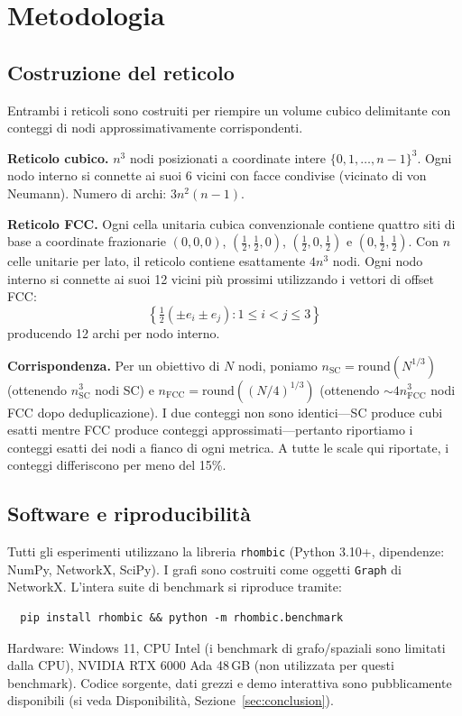 \documentclass[11pt]{article}
\begin{document}
\section{Metodologia}
\label{sec:method}

\subsection{Costruzione del reticolo}

Entrambi i reticoli sono costruiti per riempire un volume cubico
delimitante con conteggi di nodi approssimativamente corrispondenti.

\textbf{Reticolo cubico.} $n^3$ nodi posizionati a coordinate intere
$\{0, 1, \ldots, n{-}1\}^3$. Ogni nodo interno si connette ai suoi
6 vicini con facce condivise (vicinato di von Neumann). Numero di archi:
$3n^2(n-1)$.

\textbf{Reticolo FCC.} Ogni cella unitaria cubica convenzionale contiene
quattro siti di base a coordinate frazionarie $(0,0,0)$,
$(\tfrac{1}{2},\tfrac{1}{2},0)$, $(\tfrac{1}{2},0,\tfrac{1}{2})$ e
$(0,\tfrac{1}{2},\tfrac{1}{2})$. Con $n$ celle unitarie per lato, il
reticolo contiene esattamente $4n^3$ nodi. Ogni nodo interno si connette
ai suoi 12 vicini pi\`u prossimi utilizzando i vettori di offset FCC:
\begin{equation}
  \left\{\tfrac{1}{2}(\pm e_i \pm e_j) : 1 \leq i < j \leq 3\right\}
\end{equation}
producendo 12 archi per nodo interno.

\textbf{Corrispondenza.} Per un obiettivo di $N$ nodi, poniamo
$n_{\mathrm{SC}} = \mathrm{round}(N^{1/3})$ (ottenendo
$n_{\mathrm{SC}}^3$ nodi SC) e
$n_{\mathrm{FCC}} = \mathrm{round}((N/4)^{1/3})$ (ottenendo
${\sim}4 n_{\mathrm{FCC}}^3$ nodi FCC dopo deduplicazione).
I due conteggi non sono identici---SC produce cubi esatti mentre
FCC produce conteggi approssimati---pertanto riportiamo i conteggi
esatti dei nodi a fianco di ogni metrica. A tutte le scale qui
riportate, i conteggi differiscono per meno del 15\%.

\subsection{Software e riproducibilit\`a}

Tutti gli esperimenti utilizzano la libreria \texttt{rhombic} (Python
3.10+, dipendenze: NumPy, NetworkX, SciPy). I grafi sono costruiti come
oggetti \texttt{Graph} di NetworkX. L'intera suite di benchmark si
riproduce tramite:
\begin{verbatim}
  pip install rhombic && python -m rhombic.benchmark
\end{verbatim}
Hardware: Windows 11, CPU Intel (i benchmark di grafo/spaziali sono
limitati dalla CPU), NVIDIA RTX 6000 Ada 48\,GB (non utilizzata per
questi benchmark). Codice sorgente, dati grezzi e demo interattiva sono
pubblicamente disponibili (si veda Disponibilit\`a,
Sezione~\ref{sec:conclusion}).
\end{document}
